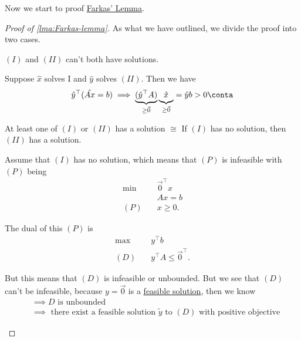 Now we start to proof \hyperref[lma:Farkas-lemma]{Farkas' Lemma}.
\begin{proof}[Proof of \autoref{lma:Farkas-lemma}]
	As what we have outlined, we divide the proof into two cases.
	\begin{claim}
		\((I)\) and \((II)\) can't both have solutions.
	\end{claim}
	\begin{explanation}
		Suppose \(\hat{x}\) solves I and \(\hat{y}\) solves \((II)\). Then we have
		\[
			\hat{y}^{\top}(\hat{Ax} = b) \implies \underbrace{(\hat{y}^{\top} A)}_{\geq  \vec{0}}\underbrace{\vphantom{\hat{y}^{\top}}\hat{x}}_{\geq  \vec{0}} = \hat{y} b > 0\conta
		\]
	\end{explanation}
	\begin{claim}
		At least one of \((I)\) or \((II)\) has a solution \(\cong\) If \((I)\) has no solution, then \((II)\) has a solution.
	\end{claim}
	\begin{explanation}
		Assume that \((I)\) has no solution, which means that \((P)\) is infeasible with \((P)\) being
		\begin{align*}
			\min~    & \vec{0}^{\top} x \\
			         & Ax = b           \\
			(P)\quad & x\geq 0.
		\end{align*}

		The dual of this \((P)\) is
		\begin{align*}
			\max~    & y^{\top}b                       \\
			(D)\quad & y^{\top} A \leq \vec{0}^{\top}.
		\end{align*}

		But this means that \((D)\) is infeasible or unbounded. But we see that \((D)\) can't be infeasible, because \(y = \vec{0}\) is a
		\hyperref[def:feasible-solution]{feasible solution}, then we know
		\[
			\begin{split}
				&\implies D \text{ is unbounded} \\
				&\implies \text{ there exist a feasible solution \(\widetilde{y}\) to \((D)\) with positive objective}
			\end{split}
		\]
	\end{explanation}
\end{proof}

